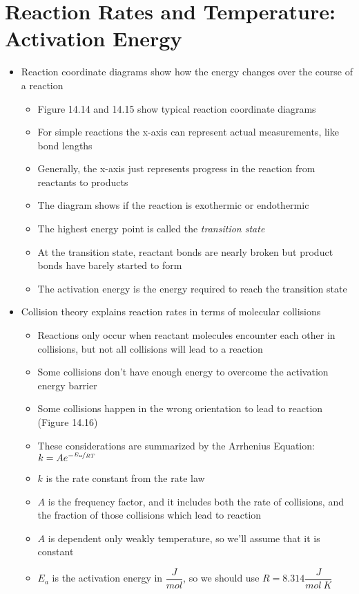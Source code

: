 \documentclass[12pt, openany, letterpaper]{memoir}
\begin{document}
\section{Reaction Rates and Temperature: Activation Energy}
\begin{itemize}
	\item Reaction coordinate diagrams show how the energy changes over the course of a reaction
	\begin{itemize}
		\item Figure 14.14 and 14.15 show typical reaction coordinate diagrams
		\item For simple reactions the x-axis can represent actual measurements, like bond lengths
		\item Generally, the x-axis just represents progress in the reaction from reactants to products
		\item The diagram shows if the reaction is exothermic or endothermic
		\item The highest energy point is called the \emph{transition state}
		\item At the transition state, reactant bonds are nearly broken but product bonds have barely started to form
		\item The activation energy is the energy required to reach the transition state
	\end{itemize}
	\item Collision theory explains reaction rates in terms of molecular collisions
	\begin{itemize}
		\item Reactions only occur when reactant molecules encounter each other in collisions, but not all collisions will lead to a reaction
		\item Some collisions don't have enough energy to overcome the activation energy barrier
		\item Some collisions happen in the wrong orientation to lead to reaction (Figure 14.16)
		\item These considerations are summarized by the Arrhenius Equation: $k=Ae^{-\nicefrac{E_a}{RT}}$
		\item $k$ is the rate constant from the rate law
		\item $A$ is the frequency factor, and it includes both the rate of collisions, and the fraction of those collisions which lead to reaction
		\item $A$ is dependent only weakly temperature, so we'll assume that it is constant
		\item $E_a$ is the activation energy in $\dfrac{J}{mol}$, so we should use $R=8.314\dfrac{J}{mol~K}$

\end{itemize}
\end{itemize}
\end{document}
